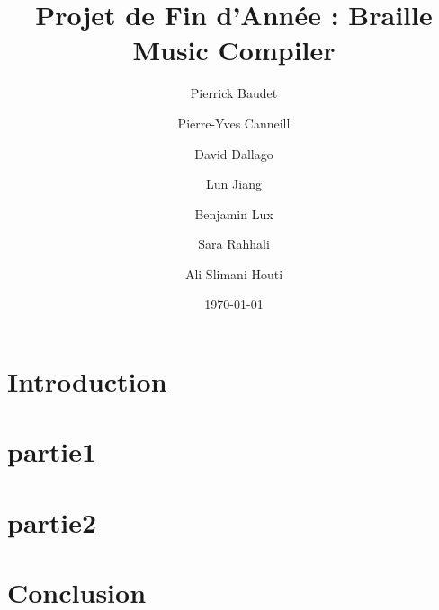 \documentclass{report}
\begin{document}
\title{Projet de Fin d'Année : Braille Music Compiler}
\author{Pierrick Baudet \and Pierre-Yves Canneill \and David Dallago \and Lun Jiang \and Benjamin Lux \and Sara Rahhali \and Ali Slimani Houti}
\date{\today}
\maketitle
\tableofcontents
\listoffigures

\chapter{Introduction}


\chapter{partie1}


\chapter{partie2}


\chapter{Conclusion}


%
\end{document}
